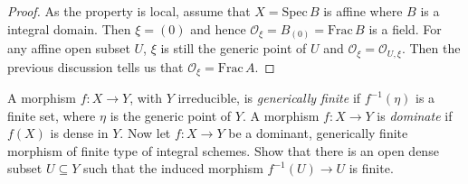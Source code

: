 \begin{proof}
	As the property is local, assume that $X=\mathrm{Spec}\,B$ is affine where $B$ is a integral domain. Then $\xi=(0)$ and hence $\mathcal{O}_{\xi}=B_{(0)}=\mathrm{Frac}\,B$ is a field. For any affine open subset $U$, $\xi$ is still the generic point of $U$ and $\mathcal{O}_{\xi}=\mathcal{O}_{U,\xi}$. Then the previous discussion tells us that $\mathcal{O}_{\xi}=\mathrm{Frac}\,A$.
\end{proof}
\begin{exe}
	\label{2.3.7}
	A morphism $f:X\to Y$, with $Y$ irreducible, is \emph{generically finite} if $f^{-1}(\eta)$ is a finite set, where $\eta$ is the generic point of $Y$. A morphism $f:X\to Y$ is \emph{dominate} if $f(X)$ is dense in $Y$. Now let $f: X \rightarrow Y$ be a dominant, generically finite morphism of finite type of integral schemes. Show that there is an open dense subset $U \subseteq Y$ such that the induced morphism $f^{-1}(U) \rightarrow U$ is finite.
\end{exe}

